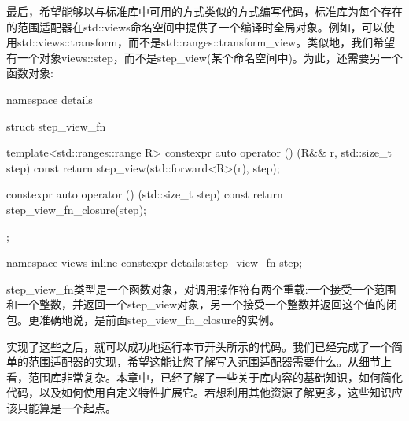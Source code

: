 最后，希望能够以与标准库中可用的方式类似的方式编写代码，标准库为每个存在的范围适配器在std::views命名空间中提供了一个编译时全局对象。例如，可以使用std::views::transform，而不是std::ranges::transform\_view。类似地，我们希望有一个对象views::step，而不是step\_view(某个命名空间中)。为此，还需要另一个函数对象:

\begin{cpp}
namespace details
{
	struct step_view_fn
	{
		template<std::ranges::range R>
		constexpr auto operator () (R&& r,
								    std::size_t step) const
		{
			return step_view(std::forward<R>(r), step);
		}
	
		constexpr auto operator () (std::size_t step) const
		{
			return step_view_fn_closure(step);
		}
	};
}

namespace views
{
	inline constexpr details::step_view_fn step;
}
\end{cpp}

step\_view\_fn类型是一个函数对象，对调用操作符有两个重载:一个接受一个范围和一个整数，并返回一个step\_view对象，另一个接受一个整数并返回这个值的闭包。更准确地说，是前面step\_view\_fn\_closure的实例。

实现了这些之后，就可以成功地运行本节开头所示的代码。我们已经完成了一个简单的范围适配器的实现，希望这能让您了解写入范围适配器需要什么。从细节上看，范围库非常复杂。本章中，已经了解了一些关于库内容的基础知识，如何简化代码，以及如何使用自定义特性扩展它。若想利用其他资源了解更多，这些知识应该只能算是一个起点。






























